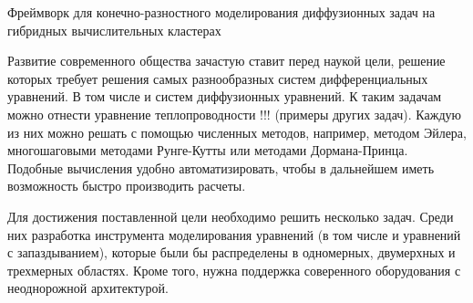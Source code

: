 \documentclass[14pt,a4paper]{extbook}
\begin{document}
\begin{center}
{\Large Фреймворк для конечно-разностного моделирования диффузионных задач на
гибридных вычислительных кластерах}
\end{center}


\par Развитие современного общества зачастую ставит перед наукой цели, решение которых требует решения самых разнообразных систем дифференциальных уравнений. В том числе и систем диффузионных уравнений. К таким задачам можно отнести уравнение теплопроводности !!! (примеры других задач). Каждую из них можно решать с помощью численных методов, например, методом Эйлера, многошаговыми методами Рунге-Кутты или методами Дормана-Принца. Подобные вычисления удобно автоматизировать, чтобы в дальнейшем иметь возможность быстро производить расчеты.
\par Для достижения поставленной цели необходимо решить несколько задач. Среди них разработка инструмента моделирования уравнений (в том числе и уравнений с запаздыванием), которые были бы распределены в одномерных, двумерхных и трехмерных областях. Кроме того, нужна поддержка соверенного оборудования с неоднорожной архитектурой.
\end{document}
